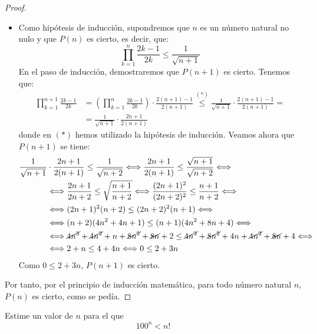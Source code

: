 \begin{ejercicio}
\begin{proof}
\begin{itemize}
            \item Como hipótesis de inducción, supondremos que $n$ es un número natural no nulo y que $P(n)$ es cierto, es decir, que:
                \begin{equation*}
                    \prod_{k=1}^n \frac{2k-1}{2k} \leq \frac{1}{\sqrt{n+1}}
                \end{equation*}
                En el paso de inducción, demostraremos que $P(n+1)$ es cierto. Tenemos que:
                \begin{align*}
                    \prod_{k=1}^{n+1} \frac{2k-1}{2k} &= \left(\prod_{k=1}^n \frac{2k-1}{2k}\right) \cdot \frac{2(n+1)-1}{2(n+1)} \stackrel{(\ast)}{\leq} \frac{1}{\sqrt{n+1}} \cdot \frac{2(n+1)-1}{2(n+1)} =\\
                    &= \frac{1}{\sqrt{n+1}} \cdot \frac{2n+1}{2(n+1)}
                \end{align*}
                donde en $(\ast)$ hemos utilizado la hipótesis de inducción. Veamos ahora que $P(n+1)$ se tiene:
                \begin{align*}
                    \frac{1}{\sqrt{n+1}} &\cdot \frac{2n+1}{2(n+1)}\leq \frac{1}{\sqrt{n+2}} \Longleftrightarrow \frac{2n+1}{2(n+1)}\leq \frac{\sqrt{n+1}}{\sqrt{n+2}} \Longleftrightarrow\\
                    &\Longleftrightarrow \frac{2n+1}{2n+2}\leq \sqrt{\frac{n+1}{n+2}}
                    \Longleftrightarrow \frac{(2n+1)^2}{(2n+2)^2}\leq \frac{n+1}{n+2} \Longleftrightarrow \\
                    &\Longleftrightarrow (2n+1)^2(n+2)\leq (2n+2)^2(n+1) \Longleftrightarrow\\
                    &\Longleftrightarrow (n+2)(4n^2+4n+1)\leq (n+1)(4n^2+8n+4) \Longleftrightarrow\\
                    &\Longleftrightarrow \cancel{4n^3}+\cancel{4n^2}+n+\cancel{8n^2}+\cancel{8n}+2\leq \cancel{4n^3}+\cancel{8n^2}+4n+\cancel{4n^2}+\cancel{8n}+4 \Longleftrightarrow\\
                    &\Longleftrightarrow 2+n \leq 4+4n \Longleftrightarrow 0 \leq 2+3n
                \end{align*}
                Como $0 \leq 2+3n$, $P(n+1)$ es cierto.
        \end{itemize}        
        Por tanto, por el principio de inducción matemática, para todo número natural $n$, $P(n)$ es cierto, como se pedía.
    \end{proof}
\end{ejercicio}


\begin{ejercicio}
    Estime un valor de $n$ para el que
    $$100^n < n!$$
\end{ejercicio}
